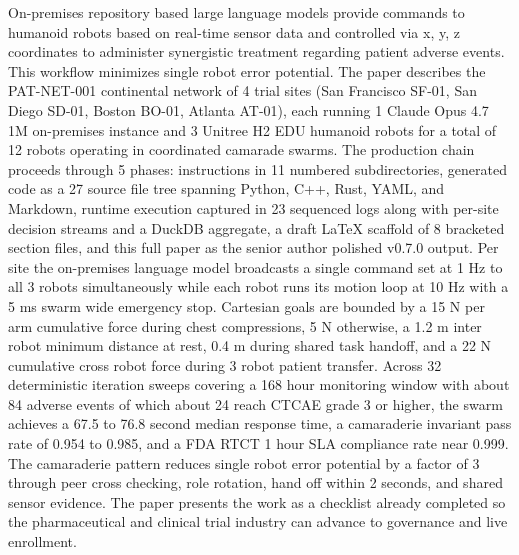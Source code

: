 %
%

\begin{sectionaccent}

On-premises repository based large language models provide commands
to humanoid robots based on real-time sensor data and controlled via
x, y, z coordinates to administer synergistic treatment regarding
patient adverse events. This workflow minimizes single robot error
potential. The paper describes the PAT-NET-001 continental network of
4 trial sites (San Francisco SF-01, San Diego SD-01, Boston BO-01,
Atlanta AT-01), each running 1 Claude Opus 4.7 1M on-premises instance
and 3 Unitree H2 EDU humanoid robots for a total of 12 robots
operating in coordinated camarade swarms. The production chain
proceeds through 5 phases: instructions in 11 numbered subdirectories,
generated code as a 27 source file tree spanning Python, C++, Rust,
YAML, and Markdown, runtime execution captured in 23 sequenced logs
along with per-site decision streams and a DuckDB aggregate, a draft
LaTeX scaffold of 8 bracketed section files, and this full paper as
the senior author polished v0.7.0 output. Per site the on-premises
language model broadcasts a single command set at 1 Hz to all 3 robots
simultaneously while each robot runs its motion loop at 10 Hz with a
5 ms swarm wide emergency stop. Cartesian goals are bounded by a 15 N
per arm cumulative force during chest compressions, 5 N otherwise, a
1.2 m inter robot minimum distance at rest, 0.4 m during shared task
handoff, and a 22 N cumulative cross robot force during 3 robot
patient transfer. Across 32 deterministic iteration sweeps covering a
168 hour monitoring window with about 84 adverse events of which
about 24 reach CTCAE grade 3 or higher, the swarm achieves a 67.5 to
76.8 second median response time, a camaraderie invariant pass rate
of 0.954 to 0.985, and a FDA RTCT 1 hour SLA compliance rate near
0.999. The camaraderie pattern reduces single robot error potential
by a factor of 3 through peer cross checking, role rotation, hand off
within 2 seconds, and shared sensor evidence. The paper presents the
work as a checklist already completed so the pharmaceutical and
clinical trial industry can advance to governance and live enrollment.

\end{sectionaccent}
